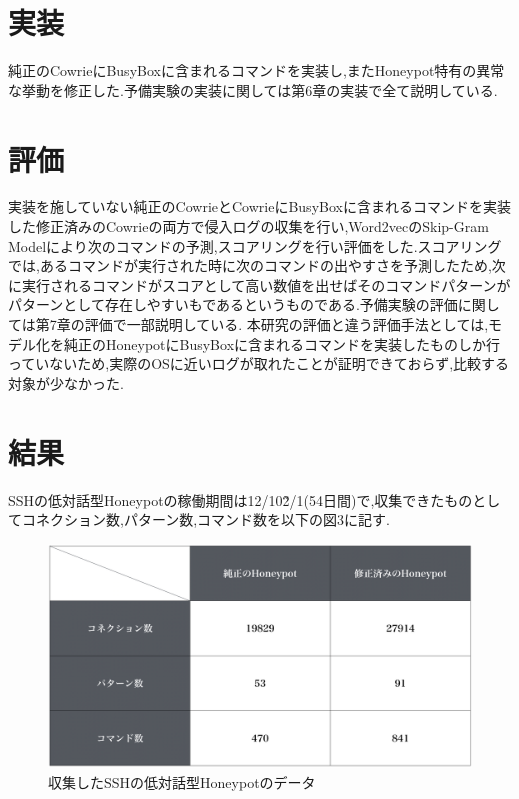 \section{実装}
\label{prex:impl}
純正のCowrieにBusyBoxに含まれるコマンドを実装し,またHoneypot特有の異常な挙動を修正した.予備実験の実装に関しては第6章の実装で全て説明している.

\section{評価}
\label{prex:eval}
実装を施していない純正のCowrieとCowrieにBusyBoxに含まれるコマンドを実装した修正済みのCowrieの両方で侵入ログの収集を行い,Word2vecのSkip-Gram Modelにより次のコマンドの予測,スコアリングを行い評価をした.スコアリングでは,あるコマンドが実行された時に次のコマンドの出やすさを予測したため,次に実行されるコマンドがスコアとして高い数値を出せばそのコマンドパターンがパターンとして存在しやすいもであるというものである.予備実験の評価に関しては第7章の評価で一部説明している.
本研究の評価と違う評価手法としては,モデル化を純正のHoneypotにBusyBoxに含まれるコマンドを実装したものしか行っていないため,実際のOSに近いログが取れたことが証明できておらず,比較する対象が少なかった.

\section{結果}
\label{prex:conc}
SSHの低対話型Honeypotの稼働期間は12/10\~2/1(54日間)で,収集できたものとしてコネクション数,パターン数,コマンド数を以下の図3に記す.

\begin{figure}[H]
    \centering
    \includegraphics[width=1.0\textwidth]{figures/term.png}
    \caption{収集したSSHの低対話型Honeypotのデータ}
    \label{fig:evo}
\end{figure}

